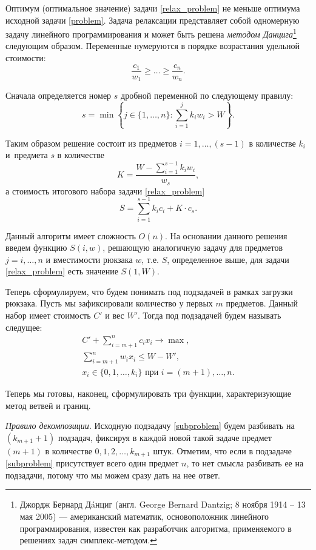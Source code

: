 \documentclass[12pt, a4paper]{article}
\begin{document}
	Оптимум (оптимальное значение) задачи \eqref{relax_problem} не меньше оптимума исходной задачи \eqref{problem}. Задача релаксации представляет собой одномерную задачу линейного программирования и может быть решена \textit{методом Данцига}\footnote{Джордж Бернард Д\'{a}нциг (англ. George Bernard Dantzig; 8 ноября 1914 -- 13 мая 2005) --- американский математик, основоположник линейного программирования, известен как разработчик алгоритма, применяемого в решениях задач симплекс-методом.} следующим образом. Переменные нумеруются в порядке возрастания удельной стоимости:
	\[
	\frac{c_1}{w_1} \ge \dots \ge \frac{c_n}{w_n}.
	\]
	
	Сначала определяется номер $s$ дробной переменной по следующему правилу:
	\[
	s = \min \left\{j \in \{1,\dots, n\} : \sum_{i=1}^j k_i w_i > W \right\}.
	\]
	
	Таким образом решение состоит из предметов $i = 1, \dots, (s-1)$ в количестве $k_i$ и~предмета $s$ в количестве
	\[
	K = \frac{W - \sum\limits_{i=1}^{s-1} k_i w_i}{w_s},
	\]
	а стоимость итогового набора задачи \eqref{relax_problem}
	\[
	S = \sum_{i=1}^{s-1} k_i c_i + K\cdot c_s.
	\]
	
	Данный алгоритм имеет сложность $O(n)$. На основании данного решения введем функцию $S(i, w)$, решающую аналогичную задачу для предметов $j = i,\dots, n$ и вместимости рюкзака $w$, т.е. $S$, определенное выше, для задачи \eqref{relax_problem} есть значение $S(1, W)$.
	
	Теперь сформулируем, что будем понимать под подзадачей в рамках загрузки рюкзака. Пусть мы зафиксировали количество у первых $m$ предметов. Данный набор имеет стоимость $C'$ и вес $W'$. Тогда под подзадачей будем называть следущее:
	\begin{equation}
		\label{subproblem}
		\begin{gathered}
			C' + \sum_{i=m+1}^{n} c_i x_i \rightarrow \max, \\
			\sum_{i=m+1}^{n} w_i x_i \le W - W', \\
			x_i \in \{0,1,\dots,k_i\} \textrm{ при } i=(m+1),\dots, n.
		\end{gathered}
	\end{equation}
	
	Теперь мы готовы, наконец, сформулировать три функции, характеризующие метод ветвей и границ.
	
	\textit{Правило декомпозиции.} Исходную подзадачу \eqref{subproblem} будем разбивать на $(k_{m+1}+1)$ подзадач, фиксируя в каждой новой такой задаче предмет $(m + 1)$ в количестве $0, 1, 2, \dots, k_{m+1}$ штук. Отметим, что если в подзадаче \eqref{subproblem} присутствует всего один предмет $n$, то нет смысла разбивать ее на подзадачи, потому что мы можем сразу дать на нее ответ.
	
\end{document}
